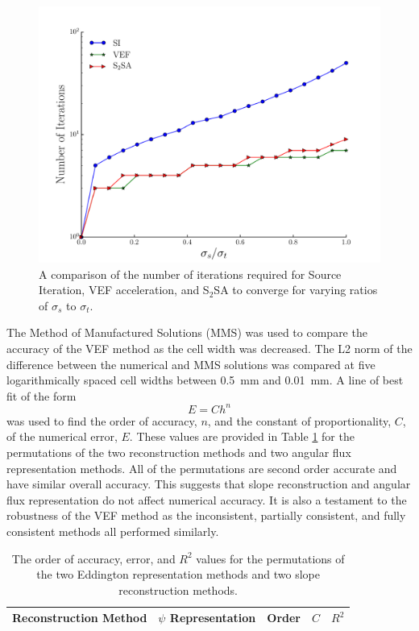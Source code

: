 	\begin{figure}
		\centering
		\includegraphics[width=.75\textwidth]{figs/si_vef_s2sa.pdf} 
		\caption{A comparison of the number of iterations required for Source Iteration, VEF acceleration, and S$_2$SA to converge for varying ratios of $\sigma_s$ to $\sigma_t$. } 
		\label{fig:si_vef_s2sa}
	\end{figure}

The Method of Manufactured Solutions (MMS) was used to compare the accuracy of the VEF method as the cell width was decreased. The L2 norm of the difference between the numerical and MMS solutions was compared at five logarithmically spaced cell widths between \SI{0.5}{mm} and \SI{0.01}{mm}. A line of best fit of the form 
	\begin{equation}
		E = C h^n
	\end{equation}
was used to find the order of accuracy, $n$, and the constant of proportionality, $C$, of the numerical error, $E$. These values are provided in Table \ref{tab:mms} for the permutations of the two reconstruction methods and two angular flux representation methods. All of the permutations are second order accurate and have similar overall accuracy. This suggests that slope reconstruction and angular flux representation do not affect numerical accuracy. It is also a testament to the robustness of the VEF method as the inconsistent, partially consistent, and fully consistent methods all performed similarly. 

	\begin{table} \centering
	\begin{tabular}{|c|c|c|c|c|}
	\hline
	\hline
	Reconstruction Method & $\psi$ Representation & Order & $C$ & $R^2$ \\ 
	\hline
		
	\hline
	\hline
	\end{tabular}
	\caption{The order of accuracy, error, and $R^2$ values for the permutations of the two Eddington representation methods and two slope reconstruction methods. }
	\label{tab:mms}
	\end{table}
	\afterpage{\clearpage}

